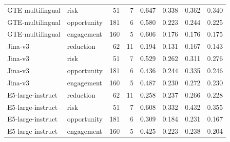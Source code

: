 \begin{longtable}{llrrrrrr}
GTE-multilingual & risk & 51 & 7 & 0.647 & 0.338 & 0.362 & 0.340 \\
GTE-multilingual & opportunity & 181 & 6 & 0.580 & 0.223 & 0.244 & 0.225 \\
GTE-multilingual & engagement & 160 & 5 & 0.606 & 0.176 & 0.176 & 0.175 \\
Jina-v3 & reduction & 62 & 11 & 0.194 & 0.131 & 0.167 & 0.143 \\
Jina-v3 & risk & 51 & 7 & 0.529 & 0.262 & 0.311 & 0.276 \\
Jina-v3 & opportunity & 181 & 6 & 0.436 & 0.244 & 0.335 & 0.246 \\
Jina-v3 & engagement & 160 & 5 & 0.487 & 0.230 & 0.272 & 0.230 \\
E5-large-instruct & reduction & 62 & 11 & 0.258 & 0.237 & 0.266 & 0.228 \\
E5-large-instruct & risk & 51 & 7 & 0.608 & 0.332 & 0.432 & 0.355 \\
E5-large-instruct & opportunity & 181 & 6 & 0.309 & 0.184 & 0.231 & 0.167 \\
E5-large-instruct & engagement & 160 & 5 & 0.425 & 0.223 & 0.238 & 0.204 \\
\end{longtable}
